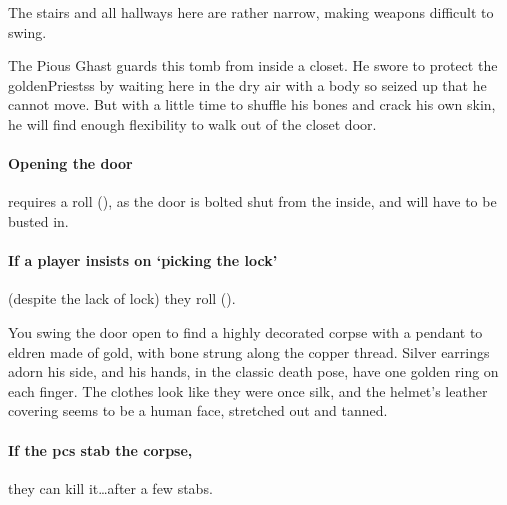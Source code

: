 \begin{multicols}{2}
The stairs and all hallways here are rather narrow, making weapons difficult to swing.%


The Pious Ghast guards this tomb from inside a closet.
He swore to protect the \glspl{goldenPriests} by waiting here in the dry air with a body so seized up that he cannot move.
But with a little time to shuffle his bones and crack his own skin, he will find enough flexibility to walk out of the closet door.


\paragraph{Opening the door}
requires a  roll (\tn[14]), as the door is bolted shut from the inside, and will have to be busted in.

\paragraph{If a player insists on `picking the lock'}
(despite the lack of lock) they roll  (\tn[16]).

\begin{boxtext}
  You swing the door open to find a highly decorated corpse with a pendant to \gls{eldren} made of gold, with bone strung along the copper thread.
  Silver earrings adorn his side, and his hands, in the classic death pose, have one golden ring on each finger.
  The clothes look like they were once silk, and the helmet's leather covering seems to be a human face, stretched out and tanned.
\end{boxtext}

\paragraph{If the \glspl{pc} stab the corpse,}
they can kill it\ldots after a few stabs.


\end{multicols}
